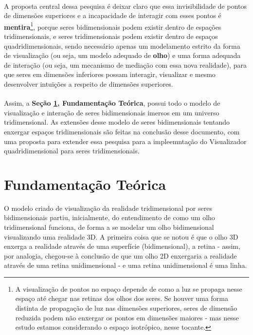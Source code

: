 \documentclass{article}
\begin{document}
	\paragraph{}
	A proposta central dessa pesquisa é deixar claro que essa invisibilidade de pontos de dimensões superiores e a incapacidade de interagir com esses pontos é \textbf{mentira}\footnote{A visualização de pontos no espaço depende de como a luz se propaga nesse espaço até chegar nas retinas dos olhos dos seres. Se houver uma forma distinta de propagação de luz nas dimensões superiores, seres de dimensão reduzida podem não enxergar os pontos em dimensões maiores - mas nesse estudo estamos considerando o espaço isotrópico, nesse tocante.}, porque seres bidimensionais podem existir dentro de espações tridimensionais, e seres tridimensionais podem existir dentro de espaços quadridimensionais, sendo necessário apenas um modelamento estrito da forma de visualização (ou seja, um modelo adequado de \textbf{olho}) e uma forma adequada de interação (ou seja, um mecanismo de mediação com essa nova realidade), para que seres em dimensões inferiores possam interagir, visualizar e mesmo desenvolver intuições a respeito de dimensões superiores.
	
	\paragraph{}
	Assim, a \textbf{Seção \ref{ft}, Fundamentação Teórica}, possui todo o modelo de visualização e interação de seres bidimensionais imersos em um universo tridimensional. As extensões desse modelo de seres bidimensionais tentando enxergar espaços tridimensionais são feitas na conclusão desse documento, com uma proposta para extender essa pesquisa para a impleemntação do Visualizador quadridimensional para seres tridimensionais. 
	
	\section{Fundamentação Teórica} \label{ft}
	\paragraph{}
	O modelo criado de visualização da realidade tridimensional por seres bidimensionais partiu, inicialmente, do entendimento de como um olho tridimensional funciona, de forma a se modelar um olho bidimensional visualizando uma realidade 3D. A primeira coisa que se notou é que o olho 3D enxerga a realidade através de uma superfície (bidimensional), a retina - assim, por analogia, chegou-se à conclusão de que um olho 2D enxergaria a realidade através de uma retina unidimensional - e uma retina unidimensional é uma linha.
	
\end{document}
